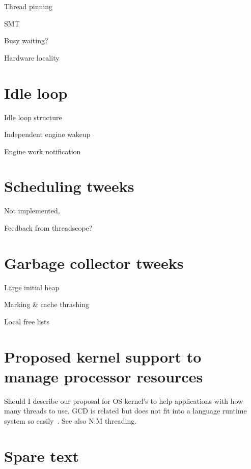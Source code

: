 Thread pinning

SMT

Busy waiting?

Hardware locality

\section{Idle loop}

Idle loop structure

Independent engine wakeup

Engine work notification

\section{Scheduling tweeks}

Not implemented,

Feedback from threadscope?

\section{Garbage collector tweeks}

Large initial heap

Marking \& cache thrashing

Local free lists

\section{Proposed kernel support to manage processor resources}

    
Should I describe our proposal for OS kernel's to help
applications with how many threads to use.
GCD is related but does not fit into a language runtime system so
easily~\cite{apple_gcd}.
See also N:M threading.

\section{Spare text}


%
%

